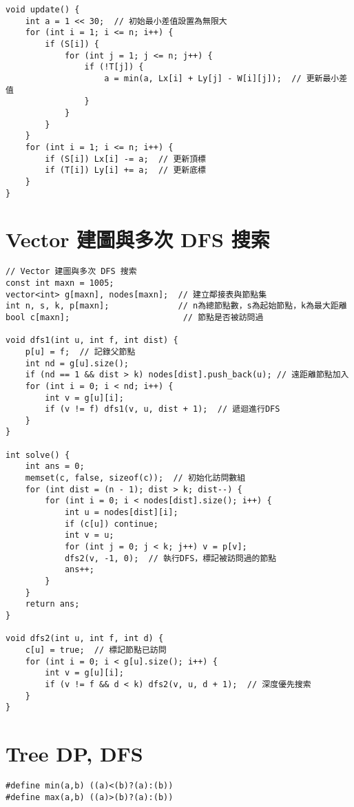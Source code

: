 \documentclass{article}
\begin{document}
\begin{multicols}{2}
\begin{lstlisting}
void update() {
    int a = 1 << 30;  // 初始最小差值設置為無限大
    for (int i = 1; i <= n; i++) {
        if (S[i]) {
            for (int j = 1; j <= n; j++) {
                if (!T[j]) {
                    a = min(a, Lx[i] + Ly[j] - W[i][j]);  // 更新最小差值
                }
            }
        }
    }
    for (int i = 1; i <= n; i++) {
        if (S[i]) Lx[i] -= a;  // 更新頂標
        if (T[i]) Ly[i] += a;  // 更新底標
    }
}
\end{lstlisting}

\section{Vector 建圖與多次 DFS 搜索}

\begin{lstlisting}
// Vector 建圖與多次 DFS 搜索
const int maxn = 1005;
vector<int> g[maxn], nodes[maxn];  // 建立鄰接表與節點集
int n, s, k, p[maxn];              // n為總節點數，s為起始節點，k為最大距離
bool c[maxn];                       // 節點是否被訪問過

void dfs1(int u, int f, int dist) {
    p[u] = f;  // 記錄父節點
    int nd = g[u].size();
    if (nd == 1 && dist > k) nodes[dist].push_back(u); // 遠距離節點加入
    for (int i = 0; i < nd; i++) {
        int v = g[u][i];
        if (v != f) dfs1(v, u, dist + 1);  // 遞迴進行DFS
    }
}

int solve() {
    int ans = 0;
    memset(c, false, sizeof(c));  // 初始化訪問數組
    for (int dist = (n - 1); dist > k; dist--) {
        for (int i = 0; i < nodes[dist].size(); i++) {
            int u = nodes[dist][i];
            if (c[u]) continue;
            int v = u;
            for (int j = 0; j < k; j++) v = p[v];
            dfs2(v, -1, 0);  // 執行DFS，標記被訪問過的節點
            ans++;
        }
    }
    return ans;
}

void dfs2(int u, int f, int d) {
    c[u] = true;  // 標記節點已訪問
    for (int i = 0; i < g[u].size(); i++) {
        int v = g[u][i];
        if (v != f && d < k) dfs2(v, u, d + 1);  // 深度優先搜索
    }
}
\end{lstlisting}

\section{Tree DP, DFS}

\begin{lstlisting}
#define min(a,b) ((a)<(b)?(a):(b))
#define max(a,b) ((a)>(b)?(a):(b))


\end{lstlisting}
\end{multicols}
\end{document}
